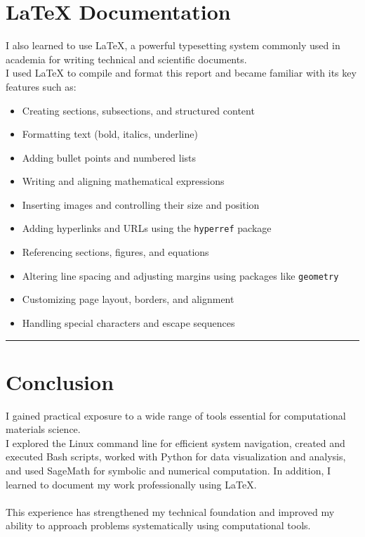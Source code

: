 \documentclass[a4paper,12pt=]{article}
\begin{document}
\section{LaTeX Documentation}
 I also learned to use \LaTeX{}, a powerful typesetting system commonly used in academia for writing technical and scientific documents. \\I used \LaTeX{} to compile and format this report and became familiar with its key features such as:

\begin{itemize}
    \item Creating sections, subsections, and structured content
    \item Formatting text (bold, italics, underline)
    \item Adding bullet points and numbered lists
    \item Writing and aligning mathematical expressions
    \item Inserting images and controlling their size and position
    \item Adding hyperlinks and URLs using the \texttt{hyperref} package
    \item Referencing sections, figures, and equations
    \item Altering line spacing and adjusting margins using packages like \texttt{geometry}
    \item Customizing page layout, borders, and alignment
    \item Handling special characters and escape sequences
\end{itemize}
\rule{\linewidth}{0.1pt}

\section{Conclusion}
I gained practical exposure to a wide range of tools essential for computational materials science. \\I explored the Linux command line for efficient system navigation, created and executed Bash scripts, worked with Python for data visualization and analysis, and used SageMath for symbolic and numerical computation. In addition, I learned to document my work professionally using \LaTeX{}. \\ \\This experience has strengthened my technical foundation and improved my ability to approach problems systematically using computational tools.
\end{document}
